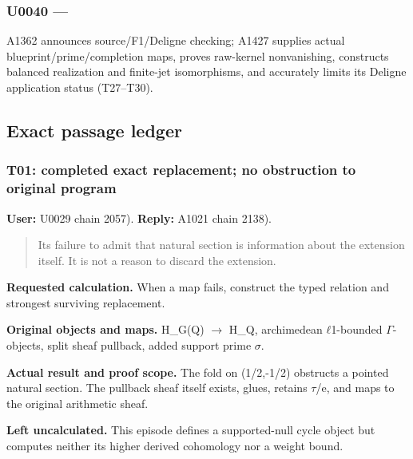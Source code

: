 \documentclass[10pt,a4paper,oneside]{report}
\begin{document}
\subsubsection{\texorpdfstring{U0040 ---
\protect{}}{U0040 --- }}\label{u0040-a10456e9-7f72-4c81-bc00-118fcd575269}

A1362 announces source/F1/Deligne checking; A1427 supplies actual
blueprint/prime/completion maps, proves raw-kernel nonvanishing,
constructs balanced realization and finite-jet isomorphisms, and
accurately limits its Deligne application status (T27--T30).

\subsection{Exact passage ledger}\label{exact-passage-ledger}

\subsubsection{T01: completed exact replacement; no obstruction to
original
program}\label{t01-completed-exact-replacement-no-obstruction-to-original-program}

\textbf{User:} U0029
\protect{} chain 2057).
\textbf{Reply:} A1021
\protect{} chain 2138).

\begin{quote}
Its failure to admit that natural section is information about the
extension itself. It is not a reason to discard the extension.
\end{quote}

\textbf{Requested calculation.} When a map fails, construct the typed
relation and strongest surviving replacement.

\textbf{Original objects and maps.} H\_G(Q)
\allowbreak{}\ensuremath{→}\allowbreak{} H\_Q, archimedean
\allowbreak{}\ensuremath{ℓ}\allowbreak{}1-bounded
\allowbreak{}\ensuremath{Γ}\allowbreak{}-objects, split sheaf pullback,
added support prime \allowbreak{}\ensuremath{σ}\allowbreak{}.

\textbf{Actual result and proof scope.} The fold on (1/2,-1/2) obstructs
a pointed natural section. The pullback sheaf itself exists, glues,
retains \allowbreak{}\ensuremath{τ}\allowbreak{}/e, and maps to the
original arithmetic sheaf.

\textbf{Left uncalculated.} This episode defines a supported-null cycle
object but computes neither its higher derived cohomology nor a weight
bound.
\end{document}
